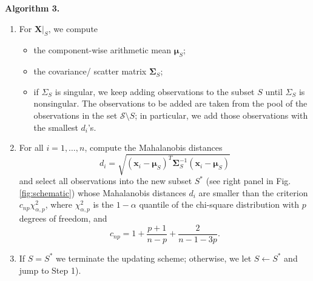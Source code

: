 \documentclass[a4paper,oneside,11pt,DIV=12]{scrartcl}
\begin{document}
\vspace{1em}
\noindent \textbf{\sffamily Algorithm 3.}
\vspace{-0.5em}
\begin{enumerate}[Step 1)]
	\item For $\bm X\vert_S$, we compute
	\begin{itemize}
		\item the component-wise arithmetic mean $\bm \mu_S$;
		\item the covariance/ scatter matrix $\bm \Sigma_S$;
		\item if $\Sigma_S$ is singular, we keep adding observations
			to the subset $S$ until $\Sigma_S$ is nonsingular. The
			observations to be added are taken from the pool of the
			observations in the set $\mathscr{S} \setminus S$; in
			particular, we add those observations with the smallest $d_i$'s.
	\end{itemize}
	\item For all $i=1,\ldots,n$, compute the Mahalanobis distances
		\begin{equation}\label{eq:mahalanobis}
			d_i = \sqrt{(\bm x_i - \bm \mu_S)^T \bm \Sigma_S^{-1}
				(\bm x_i - \bm \mu_S)}
		\end{equation}
		and select all observations into the new subset $S^*$ (see right
		panel in Fig. \ref{fig:schematic}) whose Mahalanobis distances
		$d_i$ are smaller than the criterion $c_{np} \chi_{\alpha, p}^2$,
		where $\chi_{\alpha,p}^2$ is the $1-\alpha$ quantile of the
		chi-square distribution with $p$ degrees of freedom, and
	\begin{equation}\label{eq:criterion}
		c_{np} = 1 + \frac{p + 1}{n - p} + \frac{2}{n - 1 - 3p}.
	\end{equation}
	\item If $S = S^*$ we terminate the updating scheme; otherwise, we
		let $S \gets S^*$ and jump to Step 1).
\end{enumerate}
\end{document}
